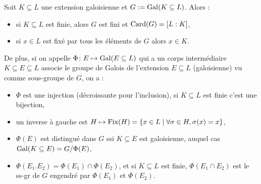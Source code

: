 	\begin{thm}
		Soit $K \subseteq L$ une extension galoisienne et $G := \operatorname{Gal}(K \subseteq L)$.
		Alors :
		\begin{itemize}
			\item[\textbullet] si $K \subseteq L$ est finie, alors $G$ est fini et $\operatorname{Card}(G) = [L : K]$,
			\item[\textbullet] si $x \in L$ est fixé par tous les éléments de $G$ alors $x \in K$.
		\end{itemize}
		De plus, si on appelle $\Phi \colon E \mapsto \operatorname{Gal}(E \subseteq L)$ qui a un corps intermédiaire $K \subseteq E \subseteq L$ associe le groupe de Galois de l'extension $E \subseteq L$ (galoisienne) vu comme sous-groupe de $G$, on a :
		\begin{itemize}
			\item[\textbullet] $\Phi$ est une injection (décroissante pour l'inclusion), si $K \subseteq L$ est finie c'est une bijection,
			\item[\textbullet] un inverse à gauche est $H \mapsto \operatorname{Fix}(H) = \{ x \in L \mid \forall \sigma \in H, \sigma(x) = x \}$,
			\item[\textbullet] $\Phi(E)$ est distingué dans $G$ ssi $K \subseteq E$ est galoisienne, auquel cas $\operatorname{Gal}(K \subseteq E) = G/\Phi(E)$,
			\item[\textbullet] $\Phi(E_1 . E_2) = \Phi(E_1) \cap \Phi(E_2)$, et si $K \subseteq L$ est finie, $\Phi(E_1 \cap E_2)$ est le ss-gr de $G$ engendré par $\Phi(E_1)$ et $\Phi(E_2)$.
		\end{itemize}
	\end{thm}